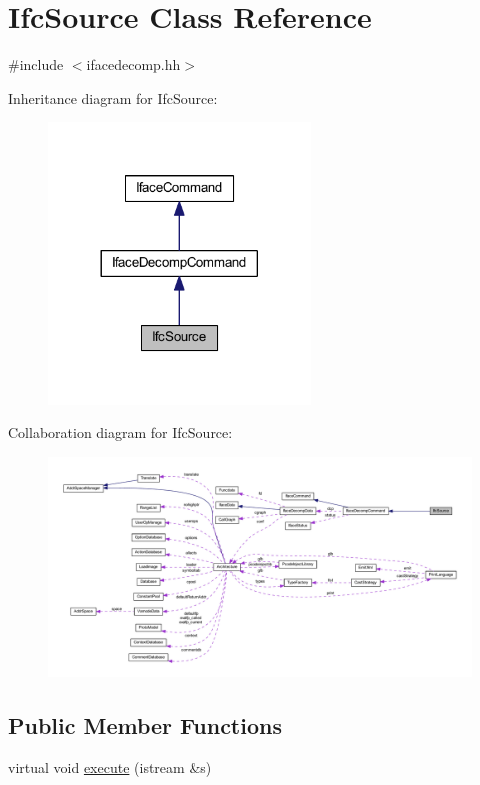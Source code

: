 \hypertarget{class_ifc_source}{}\section{Ifc\+Source Class Reference}
\label{class_ifc_source}


{\ttfamily \#include $<$ifacedecomp.\+hh$>$}



Inheritance diagram for Ifc\+Source\+:
\nopagebreak
\begin{figure}[H]
\begin{center}
\leavevmode
\includegraphics[width=197pt]{class_ifc_source__inherit__graph}
\end{center}
\end{figure}


Collaboration diagram for Ifc\+Source\+:
\nopagebreak
\begin{figure}[H]
\begin{center}
\leavevmode
\includegraphics[width=350pt]{class_ifc_source__coll__graph}
\end{center}
\end{figure}
\subsection*{Public Member Functions}
\begin{DoxyCompactItemize}
\item 
virtual void \mbox{\hyperlink{class_ifc_source_a53da0f4768e86d92bea07dc05b4a878f}{execute}} (istream \&s)
\end{DoxyCompactItemize}
